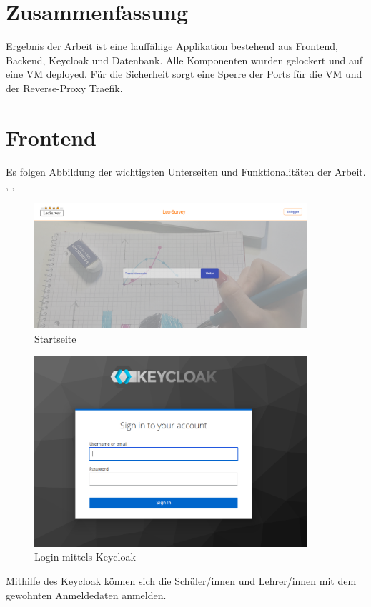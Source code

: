 \section{Zusammenfassung}
Ergebnis der Arbeit ist eine lauffähige Applikation bestehend aus Frontend, Backend, Keycloak und Datenbank.
Alle Komponenten wurden gelockert und auf eine VM deployed. Für die Sicherheit sorgt eine Sperre der Ports für die VM und der 
Reverse-Proxy Traefik.

\section{Frontend}
Es folgen Abbildung der wichtigsten Unterseiten und Funktionalitäten der Arbeit. \cite{noauthor_felx-box_nodate}, \cite{noauthor_w3schools_nodate}, \cite{noauthor_wait_nodate}
\begin{figure}[H]
    \includegraphics[width=0.9\textwidth]{pics/Ergebnis_Startseite.PNG}
    \centering
    \caption{Startseite}
\end{figure}

\begin{figure}[H]
    \includegraphics[width=0.9\textwidth]{pics/Ergebniss_KC.PNG}
    \centering
    \caption{Login mittels Keycloak}
\end{figure}
Mithilfe des Keycloak können sich die Schüler/innen und Lehrer/innen mit dem gewohnten Anmeldedaten anmelden.   


